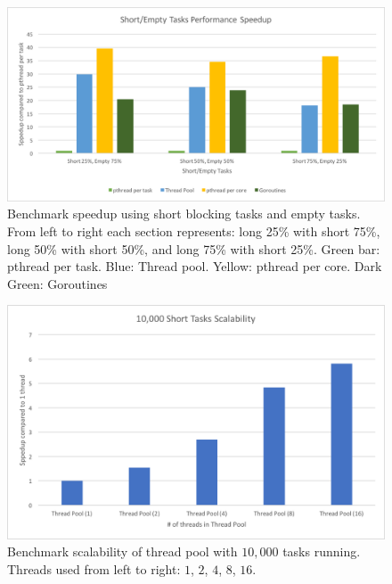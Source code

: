 \documentclass[journal, a4paper]{IEEEtran}
\begin{document}
	
\begin{figure}[!hbt]
		\begin{center}
		\includegraphics[width=\columnwidth]{test_2.png}
		\caption{Benchmark speedup using short blocking tasks and empty tasks. From left to right each section represents: long 25\% with short 75\%, long 50\% with short 50\%, and long 75\% with short 25\%. Green bar: pthread per task. Blue: Thread pool. Yellow: pthread per core. Dark Green: Goroutines}
		\label{fig:tf_plot}
		\end{center}
	\end{figure}
	
\begin{figure}[!hbt]
		\begin{center}
		\includegraphics[width=\columnwidth]{test_3.png}
		\caption{Benchmark scalability of thread pool with $10,000$ tasks running. Threads used from left to right: $1$, $2$, $4$, $8$, $16$.}
		\label{fig:tf_plot}
		\end{center}
	\end{figure}
\end{document}
